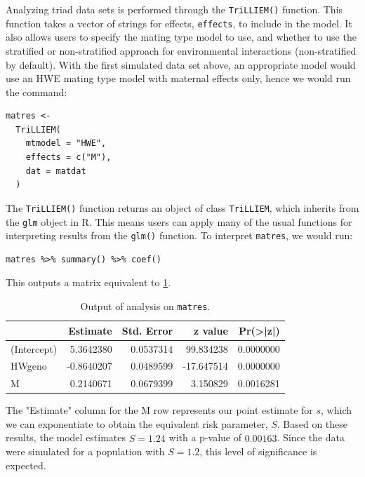 Analyzing triad data sets is performed through the \texttt{TriLLIEM()} function.
This function takes a vector of strings for effects, \texttt{effects}, to include in the model.
It also allows users to specify the mating type model to use, and whether to use the stratified or non-stratified approach for environmental interactions (non-stratified by default).
With the first simulated data set above, an appropriate model would use an HWE mating type model with maternal effects only, hence we would run the command:
\begin{verbatim}
matres <-
  TriLLIEM(
    mtmodel = "HWE",
    effects = c("M"),
    dat = matdat
  )
\end{verbatim}
The \texttt{TriLLIEM()} function returns an object of class \texttt{TriLLIEM}, which inherits from the \texttt{glm} object in R.
This means users can apply many of the usual functions for interpreting results from the \texttt{glm()} function.
To interpret \texttt{matres}, we would run:
\begin{verbatim}
matres %>% summary() %>% coef()
\end{verbatim}
This outputs a matrix equivalent to \cref{tab:simpleres}.
\begin{table}[htb]
  \caption{Output of analysis on \texttt{matres}.\label{tab:simpleres}}
  \centering
\begin{tabular}{lrrrr}
\toprule
  & Estimate & Std. Error & z value & Pr(>|z|)\\
\midrule
(Intercept) & 5.3642380 & 0.0537314 & 99.834238 & 0.0000000\\
HWgeno & -0.8640207 & 0.0489599 & -17.647514 & 0.0000000\\
M & 0.2140671 & 0.0679399 & 3.150829 & 0.0016281\\
\bottomrule
\end{tabular}
\end{table}

The "Estimate" column for the $\textrm{M}$ row represents our point estimate for $s$, which we can exponentiate to obtain the equivalent risk parameter, $S$.
Based on these results, the model estimates $\hat{S} = 1.24$ with a p-value of $0.00163$.
Since the data were simulated for a population with $S = 1.2$, this level of significance is expected.

